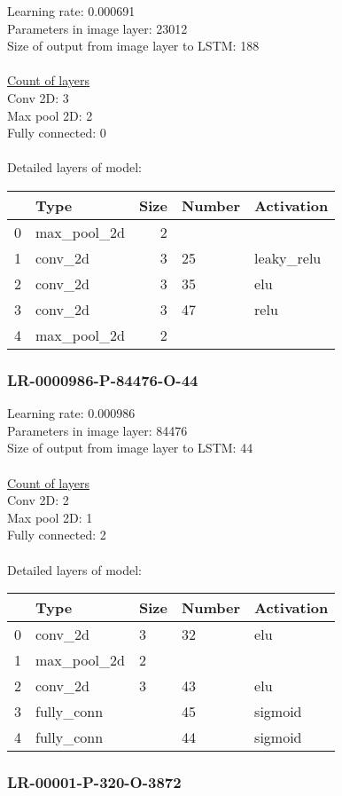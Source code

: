 Learning rate: 0.000691
\\Parameters in image layer: 23012
\\Size of output from image layer to LSTM: 188
\\\\\underline{Count of layers} 
\\Conv 2D:           3\\Max pool 2D:      2\\Fully connected:  0
\\\\Detailed layers of model: \\\begin{tabular}{rlrll}
\hline
    & Type        &   Size & Number   & Activation   \\
\hline
  0 & max\_pool\_2d &      2 &          &              \\
  1 & conv\_2d     &      3 & 25       & leaky\_relu   \\
  2 & conv\_2d     &      3 & 35       & elu          \\
  3 & conv\_2d     &      3 & 47       & relu         \\
  4 & max\_pool\_2d &      2 &          &              \\
\hline
\end{tabular}\subsubsection*{LR-0000986-P-84476-O-44}
Learning rate: 0.000986
\\Parameters in image layer: 84476
\\Size of output from image layer to LSTM: 44
\\\\\underline{Count of layers} 
\\Conv 2D:           2\\Max pool 2D:      1\\Fully connected:  2
\\\\Detailed layers of model: \\\begin{tabular}{rllll}
\hline
    & Type        & Size   & Number   & Activation   \\
\hline
  0 & conv\_2d     & 3      & 32       & elu          \\
  1 & max\_pool\_2d & 2      &          &              \\
  2 & conv\_2d     & 3      & 43       & elu          \\
  3 & fully\_conn  &        & 45       & sigmoid      \\
  4 & fully\_conn  &        & 44       & sigmoid      \\
\hline
\end{tabular}\subsubsection*{LR-00001-P-320-O-3872}
